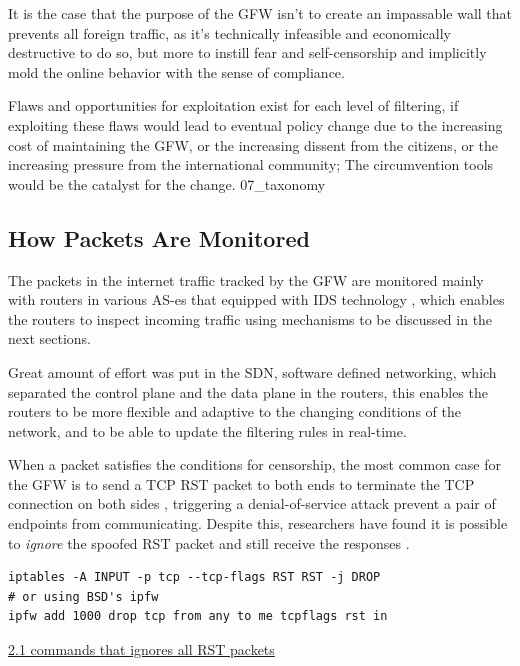 \documentclass[nonacm,sigplan,screen]{acmart}
\begin{document}
It is the case that the purpose of the GFW isn't to create an impassable
wall that prevents all foreign traffic, as it's technically infeasible
and economically destructive to do so, but more to instill fear and
self-censorship and implicitly mold the online behavior with the sense
of compliance.

Flaws and opportunities for exploitation exist for each level of
filtering, if exploiting these flaws would lead to eventual policy
change due to the increasing cost of maintaining the GFW, or the
increasing dissent from the citizens, or the increasing pressure from
the international community; The circumvention tools would be the
catalyst for the change. 07\_taxonomy

\hypertarget{how-packets-are-monitored}{%
\subsection{How Packets Are
Monitored}\label{how-packets-are-monitored}}

The packets in the internet traffic tracked by the GFW are monitored
mainly with routers in various AS-es that equipped with IDS technology
\cite{03_whereFilter}, which enables the routers to inspect incoming
traffic using mechanisms to be discussed in the next sections.

Great amount of effort was put in the SDN, software defined networking,
which separated the control plane and the data plane in the routers,
this enables the routers to be more flexible and adaptive to the
changing conditions of the network, and to be able to update the
filtering rules in real-time. \cite{15_SDN}

When a packet satisfies the conditions for censorship, the most common
case for the GFW is to send a TCP RST packet to both ends to terminate
the TCP connection on both sides \cite{03_whereFilter}, triggering a
denial-of-service attack prevent a pair of endpoints from communicating.
Despite this, researchers have found it is possible to \emph{ignore} the
spoofed RST packet and still receive the responses \cite{06_ignoring}.

\begin{verbatim}
iptables -A INPUT -p tcp --tcp-flags RST RST -j DROP
# or using BSD's ipfw
ipfw add 1000 drop tcp from any to me tcpflags rst in
\end{verbatim}
\href{}{2.1 commands that ignores all RST packets}
\end{document}
